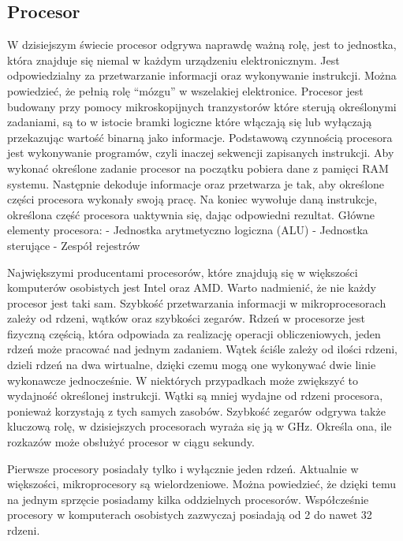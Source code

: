 \documentclass[12pt, a4paper, onside, polish]{article}				%
\begin{document}
\subsection{Procesor}
\hspace{\parindent}
W dzisiejszym świecie procesor odgrywa naprawdę ważną rolę, jest to jednostka, która znajduje się niemal w każdym urządzeniu elektronicznym. Jest odpowiedzialny za przetwarzanie informacji oraz wykonywanie instrukcji. Można powiedzieć, że pełnią rolę “mózgu” w wszelakiej elektronice. Procesor jest budowany przy pomocy mikroskopijnych tranzystorów które sterują określonymi zadaniami, są to w istocie bramki logiczne które włączają się lub wyłączają przekazując wartość binarną jako informacje. Podstawową czynnością procesora jest wykonywanie programów, czyli inaczej sekwencji zapisanych instrukcji. Aby wykonać określone zadanie procesor na początku pobiera dane z pamięci RAM systemu. Następnie dekoduje informacje oraz przetwarza je tak, aby określone części procesora wykonały swoją pracę. Na koniec wywołuje daną instrukcje, określona część procesora uaktywnia się, dając odpowiedni rezultat.  
\newline\newline
Główne elementy procesora:  
\newline
- Jednostka arytmetyczno logiczna (ALU) \newline
- Jednostka sterujące \newline
- Zespół rejestrów \newline

 
	Największymi producentami procesorów, które znajdują się w większości komputerów osobistych jest Intel oraz AMD. Warto nadmienić, że nie każdy procesor jest taki sam. Szybkość przetwarzania informacji w mikroprocesorach zależy od rdzeni, wątków oraz szybkości zegarów.  
Rdzeń w procesorze jest fizyczną częścią, która odpowiada za realizację operacji obliczeniowych, jeden rdzeń może pracować nad jednym zadaniem. Wątek ściśle zależy od ilości rdzeni, dzieli rdzeń na dwa wirtualne, dzięki czemu mogą one wykonywać dwie linie wykonawcze jednocześnie. W niektórych przypadkach może zwiększyć to wydajność określonej instrukcji. Wątki są mniej wydajne od rdzeni procesora, ponieważ korzystają z tych samych zasobów. Szybkość zegarów odgrywa także kluczową rolę, w dzisiejszych procesorach wyraża się ją w GHz. Określa ona, ile rozkazów może obsłużyć procesor w ciągu sekundy. 

Pierwsze procesory posiadały tylko i wyłącznie jeden rdzeń. Aktualnie w większości, mikroprocesory są wielordzeniowe. Można powiedzieć, że dzięki temu na jednym sprzęcie posiadamy kilka oddzielnych procesorów. Współcześnie procesory w komputerach osobistych zazwyczaj posiadają od 2 do nawet 32 rdzeni. 
\end{document}
